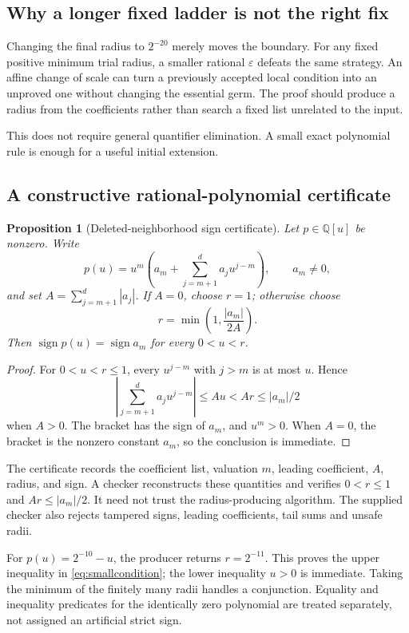 \documentclass[11pt,letterpaper]{article}
\newcommand{\Q}{\mathbb{Q}}
\newtheorem{proposition}{Proposition}[section]
\begin{document}
\subsection{Why a longer fixed ladder is not the right fix}
Changing the final radius to $2^{-20}$ merely moves the boundary. For any
fixed positive minimum trial radius, a smaller rational $\varepsilon$ defeats
the same strategy. An affine change of scale can turn a previously accepted
local condition into an unproved one without changing the essential germ.
The proof should produce a radius from the coefficients rather than search
a fixed list unrelated to the input.

This does not require general quantifier elimination. A small exact
polynomial rule is enough for a useful initial extension.

\subsection{A constructive rational-polynomial certificate}
\begin{proposition}[Deleted-neighborhood sign certificate]
Let $p\in\Q[u]$ be nonzero. Write
\[
 p(u)=u^m\left(a_m+\sum_{j=m+1}^{d}a_j u^{j-m}\right),
 \qquad a_m\ne0,
\]
and set $A=\sum_{j=m+1}^{d}|a_j|$. If $A=0$, choose $r=1$; otherwise choose
\begin{equation}
 r=\min\left(1,\frac{|a_m|}{2A}\right).
 \label{eq:certificate-radius}
\end{equation}
Then $\operatorname{sign}p(u)=\operatorname{sign}a_m$ for every $0<u<r$.
\end{proposition}
\begin{proof}
For $0<u<r\le1$, every $u^{j-m}$ with $j>m$ is at most $u$. Hence
\[
 \left|\sum_{j=m+1}^{d}a_j u^{j-m}\right|
 \le Au < Ar\le |a_m|/2
\]
when $A>0$. The bracket has the sign of $a_m$, and $u^m>0$. When $A=0$,
the bracket is the nonzero constant $a_m$, so the conclusion is immediate.
\end{proof}

The certificate records the coefficient list, valuation $m$, leading
coefficient, $A$, radius, and sign. A checker reconstructs these quantities
and verifies $0<r\le1$ and $Ar\le|a_m|/2$. It need not trust the radius-producing
algorithm. The supplied checker also rejects tampered signs, leading
coefficients, tail sums and unsafe radii.

For $p(u)=2^{-10}-u$, the producer returns $r=2^{-11}$. This proves the upper
inequality in \eqref{eq:smallcondition}; the lower inequality $u>0$ is immediate.
Taking the minimum of the finitely many radii handles a conjunction. Equality
and inequality predicates for the identically zero polynomial are treated
separately, not assigned an artificial strict sign.
\end{document}
